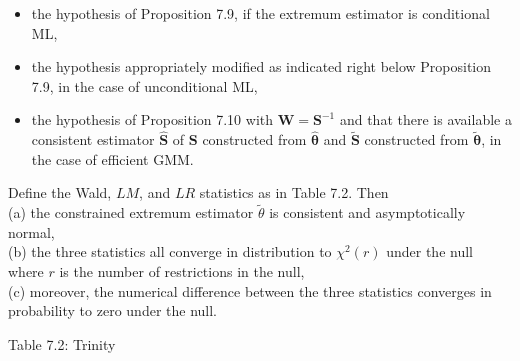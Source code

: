 \documentclass[10pt]{article}
\begin{document}
\begin{itemize}
  \item the hypothesis of Proposition 7.9, if the extremum estimator is conditional ML,
  \item the hypothesis appropriately modified as indicated right below Proposition 7.9, in the case of unconditional ML,
  \item the hypothesis of Proposition 7.10 with $\mathbf{W}=\mathbf{S}^{-1}$ and that there is available a consistent estimator $\widehat{\mathbf{S}}$ of $\mathbf{S}$ constructed from $\hat{\boldsymbol{\theta}}$ and $\widetilde{\mathbf{S}}$ constructed from $\tilde{\boldsymbol{\theta}}$, in the case of efficient GMM.
\end{itemize}

Define the Wald, $L M$, and $L R$ statistics as in Table 7.2. Then\\
(a) the constrained extremum estimator $\tilde{\theta}$ is consistent and asymptotically normal,\\
(b) the three statistics all converge in distribution to $\chi^{2}(r)$ under the null where $r$ is the number of restrictions in the null,\\
(c) moreover, the numerical difference between the three statistics converges in probability to zero under the null.

Table 7.2: Trinity
\end{document}

